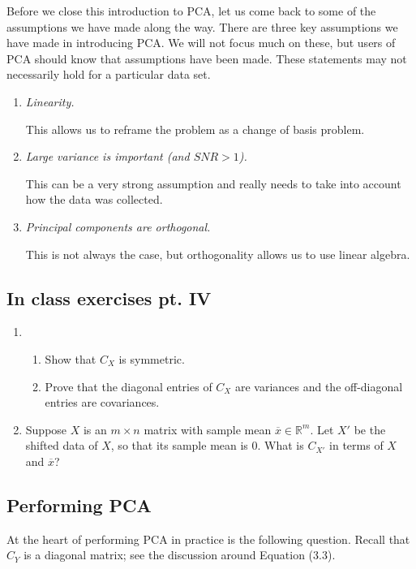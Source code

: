 \documentclass[a4paper, 12pt]{article}
\numberwithin{equation}{section}
\numberwithin{figure}{section}
\theoremstyle{definition}
\newcommand{\R}{\mathbb{R}}
\begin{document}
Before we close this introduction to PCA, let us come back to some of the
assumptions we have made along the way. There are three key assumptions we have
made in introducing PCA. We will not focus much on these, but users of PCA
should know that assumptions have been made. These statements may not
necessarily hold for a particular data set. 

\begin{enumerate}
	\item \textit{Linearity.} 
	
	This allows us to reframe the problem as a change of basis problem. 

	\item \textit{Large variance is important (and $SNR>1$).}
	
	This can be a very strong assumption and really needs to take into account
	how the data was collected. 
	
	\item \textit{Principal components are orthogonal.}
	
	This is not always the case, but orthogonality allows us to use linear
	algebra. 
\end{enumerate}

\subsection{In class exercises pt. IV}

\begin{enumerate}
	\item 
	\begin{enumerate}
		\item Show that $C_X$ is symmetric. 
		\item Prove that the diagonal entries of $C_X$ are variances and the
		off-diagonal entries are covariances. 
	\end{enumerate}
	\item Suppose $X$ is an $m\times n$ matrix with sample mean
	$\overline{x}\in\R^m$. Let $X'$ be the shifted data of $X$, so that its
	sample mean is $0$. What is $C_{X'}$ in terms of $X$ and $\overline{x}$?
\end{enumerate}

\subsection{Performing PCA}\label{sec:perform-pca}

At the heart of performing PCA in practice is the following question. Recall
that $C_Y$ is a diagonal matrix; see the discussion around Equation (3.3).
\end{document}
